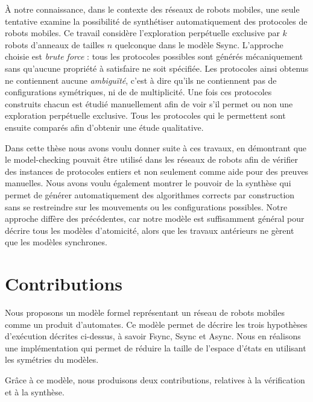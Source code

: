 À notre connaissance, dans le contexte des réseaux de robots mobiles,
une seule tentative \cite{BDPPT12c} examine la possibilité de
synthétiser automatiquement des protocoles de robots mobiles.  Ce
travail considère l'exploration perpétuelle exclusive par $k$ robots
d'anneaux de tailles $n$ quelconque dans le modèle Ssync.  L'approche
choisie est \emph{brute force} : tous les protocoles possibles sont générés
mécaniquement sans qu'aucune propriété à satisfaire ne soit
spécifiée. Les protocoles ainsi obtenus ne contiennent aucune
\emph{ambiguïté}, c'est à dire qu'ils ne contiennent pas de
configurations symétriques, ni de de multiplicité.  Une fois ces
protocoles construits chacun est étudié manuellement afin de voir s'il
permet ou non une exploration perpétuelle exclusive. Tous les
protocoles qui le permettent sont ensuite comparés afin d'obtenir une
étude qualitative.

Dans cette thèse nous avons voulu donner suite à ces travaux, en
démontrant que le model-checking pouvait être utilisé dans les réseaux
de robots afin de vérifier des instances de protocoles entiers et non
seulement comme aide pour des preuves manuelles.  Nous avons voulu
également montrer le pouvoir de la synthèse qui permet de générer
automatiquement des algorithmes corrects par construction sans se
restreindre sur les mouvements ou les configurations possibles.  Notre
approche diffère des précédentes, car notre modèle est suffisamment
général pour décrire tous les modèles d'atomicité, alors que les
travaux antérieurs ne gèrent que les modèles synchrones.



\section{Contributions}
Nous proposons un modèle formel représentant un réseau de robots
mobiles comme un produit d'automates.  Ce modèle permet de décrire les
trois hypothèses d'exécution décrites ci-dessus, à savoir Fsync, Ssync
et Async. Nous en réalisons une implémentation qui permet de réduire
la taille de l'espace d'états en utilisant les symétries du modèles.

Grâce à ce modèle, nous produisons deux contributions, relatives à la
vérification et à la synthèse.

